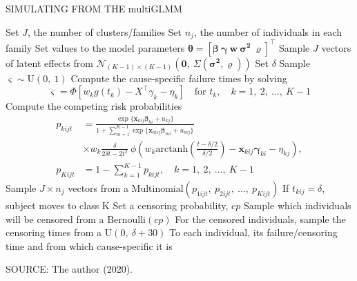 \begin{algorithm}[H]
  \caption{SIMULATING FROM THE \(\text{multiGLMM}\)}
  \label{alg:algo}
\begin{algorithmic}[1]
    \State
    Set \(J\), the number of clusters/families
    \State
    Set \(n_{j}\), the number of individuals in each family
    \State
    Set values to the model parameters \(\bm{\theta} =
    [\bm{\beta}~\bm{\gamma}~\bm{w}~\bm{\sigma^{2}}~\bm{\varrho}]^{\top}\)
    \State
    Sample \(J\) vectors of latent effects from
    \(\mathcal{N}_{(K-1)\times(K-1)}(\bm{0}, ~\Sigma(\bm{\sigma^{2}},
    \bm{\varrho}))\)
    \State
    Set \(\delta\)
    \State
    Sample \(\varsigma\sim\text{U}(0,~1)\)
    \State
    Compute the cause-specific failure times by solving
    \[
      \varsigma = \Phi[w_{k} g(t_{k}) - X^{\top}\gamma_{k} - \eta_{k}]
      \quad\text{for } t_{k}, \quad k = 1,~2,~\dots,~K - 1
    \]
    \State
    Compute the competing risk probabilities
    \begin{align*}
      p_{kijt}
      &= \frac{\exp\{\bm{x}_{kij}\bm{\beta}_{ki} + u_{kj}\}}{
        1 +
        \sum_{m=1}^{K-1}\exp\{\bm{x}_{mij}\bm{\beta}_{mi} + u_{mj}\}}\\
      &\times
        w_{k}\frac{\delta}{2\delta t - 2t^{2}}~
        \phi\left(
        w_{k}
        \text{arctanh}\left(\frac{t-\delta/2}{\delta/2}\right)
        - \bm{x}_{kij}\bm{\gamma}_{ki} - \eta_{kj}
        \right),\\
      p_{Kijt}
      &= 1 - \sum_{k = 1}^{K - 1} p_{kijt}, \quad k = 1,~2,~\dots,~K -1
    \end{align*}
    \State
    Sample \(J\times n_{j}\) vectors from a
    \(\text{Multinomial}(p_{1ijt},~p_{2ijt},~\dots,~p_{Kijt})\)
    \State
    If \(t_{kij} = \delta\), subject moves to class K
    \State
    Set a censoring probability, \(cp\)
    \State
    Sample which individuals will be censored from a
    \(\text{Bernoulli}(cp)\)
    \State
    For the censored individuals, sample the censoring times from a
    \(\text{U}(0,~\delta + 30)\)
    \State
    \Return
    To each individual, its failure/censoring time and from which
    cause-specific it is
  \end{algorithmic}
\end{algorithm}
\vspace{-.75cm}
\begin{footnotesize}
  \begin{center}
    SOURCE: The author (2020).
  \end{center}
\end{footnotesize}

